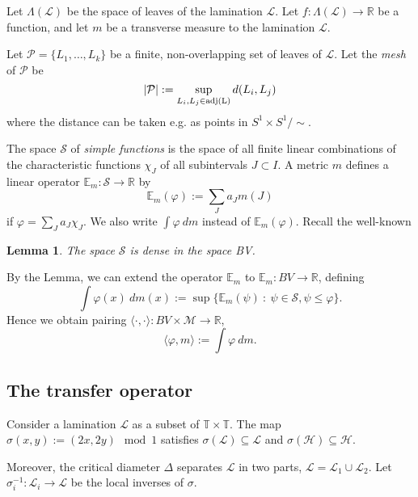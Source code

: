 \documentclass[11pt]{amsart}
\newtheorem{lemma}[theorem]{Lemma}
\begin{document}
Let $\Lambda(\mathcal{L})$ be the space of leaves of the lamination $\mathcal{L}$. 
Let $f : \Lambda(\mathcal{L}) \to \mathbb{R}$ be a function, and let $m$ be a transverse measure to the lamination $\mathcal{L}$. 

Let $\mathcal{P} = \{L_1, \dots, L_k\}$ be a finite, non-overlapping set of leaves of $\mathcal{L}$.
Let the \emph{mesh} of $\mathcal{P}$ be 
$$|\mathcal{P}| := \sup_{L_i, L_j \in \textup{adj(L)}} d(L_i, L_{j})$$
where the distance can be taken e.g. as points in $S^1 \times S^1 /\sim$. %

The space $\mathcal{S}$ of \emph{simple functions} is the space of all finite linear combinations 
of the characteristic functions $\chi_J$ of all subintervals $J \subset I$. 
A metric $m$ defines a linear operator $\mathbb{E}_m : \mathcal{S} \to \mathbb{R}$ by
$$\mathbb{E}_m(\varphi) := \sum_J a_J m(J)$$
if $\varphi = \sum_J a_J \chi_J$. We also write $\int \varphi \ dm$ instead of $\mathbb{E}_m(\varphi)$. 
Recall the well-known

\begin{lemma}  \label{L:dense}
The space $\mathcal{S}$ %
is dense in the space BV.
\end{lemma}

By the Lemma, we can extend the operator $\mathbb{E}_m$ to $\mathbb{E}_m : BV \to \mathbb{R}$, 
defining 
$$\int \varphi(x) \ dm(x) := \sup \{ \mathbb{E}_m(\psi) \ : \ \psi \in \mathcal{S}, \psi \leq \varphi \}.$$
Hence we obtain
pairing $\langle \cdot, \cdot \rangle : BV \times \mathcal{M} \to \mathbb{R}$,
$$\langle \varphi, m \rangle := \int \varphi \ dm.$$



\subsection{The transfer operator}

Consider a lamination $\mathcal{L}$ as a subset of $\mathbb{T} \times \mathbb{T}$. 
The map $\sigma(x,y) := (2 x, 2 y) \mod 1$ satisfies $\sigma(\mathcal{L}) \subseteq \mathcal{L}$ and 
$\sigma(\mathcal{H}) \subseteq \mathcal{H}$. 

Moreover, the critical diameter $\Delta$ separates $\mathcal{L}$ in two parts, $\mathcal{L} = \mathcal{L}_1 \cup \mathcal{L}_2$. 
Let $\sigma_i^{-1} : \mathcal{L}_i \to \mathcal{L}$ be the local inverses of $\sigma$. 
\end{document}
